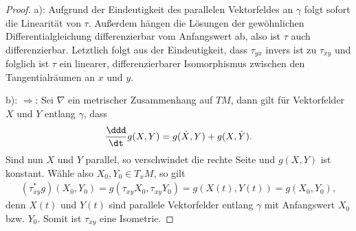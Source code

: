 \documentclass[%
	paper=a5,%
	fleqn,%
	DIV=18,%
	BCOR=0mm,
	fontsize=11pt,
	titlepage=false,%
	bibliography=totoc,
	DIV=18,%
	twoside=true,
	pdftitle=Riemannsche Geometrie,
	pdfauthor=Uwe Semmelmann,
	numbers=noendperiod]%
	{scrbook}
\begin{document}
\begin{proof}
a): Aufgrund der Eindeutigkeit des parallelen Vektorfeldes an $\gamma$ folgt
sofort die Linearität von $\tau$. Außerdem hängen die Lösungen der gewöhnlichen
Differentialgleichung differenzierbar vom Anfangswert ab, also ist $\tau$ auch
differenzierbar. Letztlich folgt aus der Eindeutigkeit, dass $\tau_{yx}$ invers
ist zu $\tau_{xy}$ und folglich ist $\tau$ ein linearer, differenzierbarer
Isomorphismus zwischen den Tangentialräumen an $x$ und $y$.

b): $\Rightarrow$: Sei $\nabla$ ein metrischer Zusammenhang auf $TM$, dann gilt
für Vektorfelder $X$ und $Y$ entlang $\gamma$, dass
\begin{align*}
\frac{\ddd}{\dt} g(X,Y) = g(\dot{X},Y) + g(X,\dot{Y}).
\end{align*}
Sind nun $X$ und $Y$ parallel, so verschwindet die rechte Seite und $g(X,Y)$ ist
konstant. Wähle also $X_0,Y_0\in T_xM$, so gilt
\begin{align*}
(\tau_{xy}^* g)(X_0,Y_0)
= g(\tau_{xy}X_0,\tau_{xy}Y_0) = g(X(t),Y(t)) = g(X_0,Y_0),
\end{align*}
denn $X(t)$ und $Y(t)$ sind parallele Vektorfelder entlang $\gamma$ mit
Anfangswert $X_0$ bzw. $Y_0$. Somit ist $\tau_{xy}$ eine Isometrie.


\end{proof}
\end{document}
